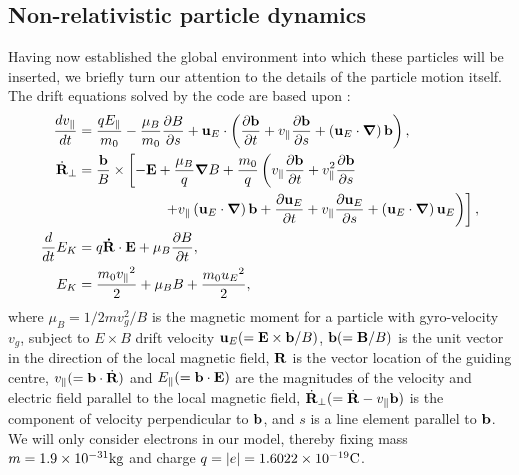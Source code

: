 \documentclass[a4paper,11pt,usenames,dvipsnames]{article}
\begin{document}
\subsection{Non-relativistic particle dynamics}\label{subsec:nonrel}
Having now established the global environment into which these particles will be inserted, we briefly turn our attention to the details of the particle motion itself. The drift equations solved by the code are based upon \cite{book:Northrop1963}:
\begin{subequations}
\begin{align}
 \frac{dv_{\parallel}}{dt}&=\frac{qE_{\parallel}}{m_0}-\frac{\mu_B}{m_0}\frac{\partial B}{\partial s}+
 {{\bf{u}}_E}\cdot\left(\frac{\partial{\bf{b}}}{\partial t}+v_{\parallel}\frac{\partial{\bf{b}}}{\partial s}+\left( {{\bf{u}}_E}\cdot\mbox{\boldmath$\nabla$}\right) {\bf{b}}\right), \label{eq:N1} \\
\dot{\bf{R}}_\perp&=\frac{\bf{b}}{B}\times\left[-{\bf{E}}+\frac{\mu_B}{q}\mbox{\boldmath$\nabla$} B+\frac{m_0}{q}\left(v_{\parallel}\frac{\partial{\bf{b}}}{\partial t}+v_{\parallel}^2\frac{\partial{\bf{b}}}{\partial s}\right.\right. \nonumber \\ 
&\qquad\qquad\qquad\left.\left.+v_{\parallel}\left( {{\bf{u}}_E}\cdot\mbox{\boldmath$\nabla$}\right) {\bf{b}}+\frac{\partial{{\bf{u}}_E}}{\partial t}+v_{\parallel}\frac{\partial {{\bf{u}}_E}}{\partial s} +\left( {{\bf{u}}_E}\cdot\mbox{\boldmath$\nabla$}\right) {{{\bf{u}}_E}}\right)  \right], \label{eq:N2} \\
\frac{d}{dt}E_K&=q{\bf{\dot{R}}}\cdot{\bf{E}}+\mu_B\frac{\partial B}{\partial t}, \label{eq:N3} \\
E_K&=\frac{m_0{v_{\parallel}}^2}{2}+\mu_BB+\frac{m_0{u_E}^2}{2}, \label{eq:N4}
\end{align}
\label{eq:nrel}
\end{subequations}
where $\mu_B=1/2mv_g^2/B$ is the magnetic moment for a particle with gyro-velocity $v_g$, subject to ${E}\times{B}$ drift velocity ${{\bf{u}}_E}(={\bf{E}}\times{\bf{b}}/B)$, ${\bf{b}}(={\bf{B}}/B)$ is the unit vector in the direction of the local magnetic field, ${\bf{R}}$ is the vector location of the guiding centre, $v_{\parallel}(={\bf{b}}\cdot{\dot{\bf{R}}})$ and $E_{\parallel}(={\bf{b}}\cdot{\bf{E}})$ are the magnitudes of the velocity and electric field parallel to the local magnetic field, $\dot{\bf{R}}_\perp(=\dot{\bf{R}}-v_{\parallel}{\bf{b}})$ is the component of velocity perpendicular to ${\bf{b}}$, and $s$ is a line element parallel to ${\bf{b}}$. We will only consider electrons in our model, thereby fixing mass $m=1.9\times10^{-31}\rm{kg}$ and charge $q=|e|=1.6022\times10^{-19}\rm{C}$.
\end{document}
